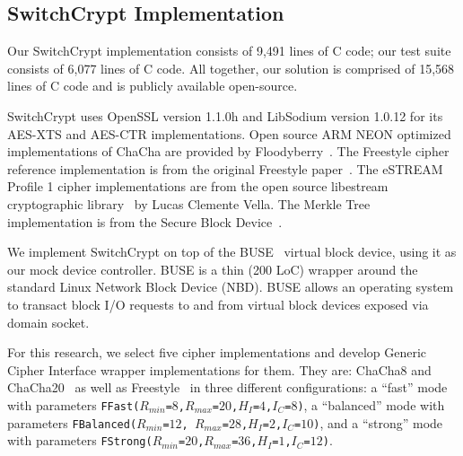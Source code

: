 
\subsection{SwitchCrypt Implementation} \label{subsec:implementation}

Our SwitchCrypt implementation consists of 9,491 lines of C code; our test suite
consists of 6,077 lines of C code. All together, our solution is comprised of
15,568 lines of C code and is publicly available open-source.

SwitchCrypt uses OpenSSL version 1.1.0h and LibSodium version 1.0.12 for its
AES-XTS and AES-CTR implementations. Open source ARM NEON optimized
implementations of ChaCha are provided by Floodyberry~\cite{Floodyberry}. The
Freestyle cipher reference implementation is from the original Freestyle
paper~\cite{Freestyle}. The eSTREAM Profile 1 cipher implementations are from
the open source libestream cryptographic library~\cite{libestream} by Lucas
Clemente Vella. The Merkle Tree implementation is from the Secure Block
Device~\cite{SBD}.

We implement SwitchCrypt on top of the BUSE~\cite{BUSE} virtual block device,
using it as our mock device controller. BUSE is a thin (200 LoC) wrapper around
the standard Linux Network Block Device (NBD). BUSE allows an operating system
to transact block I/O requests to and from virtual block devices exposed via
domain socket.

For this research, we select five cipher implementations and develop Generic
Cipher Interface wrapper implementations for them. They are: ChaCha8 and
ChaCha20~\cite{ChaCha20} as well as Freestyle~\cite{Freestyle} in three
different configurations: a ``fast'' mode with parameters
\texttt{FFast($R_{min}$=$8$,$R_{max}$=$20$,$H_I$=$4$,$I_C$=$8$)}, a ``balanced''
mode with parameters \texttt{FBalanced($R_{min}$=$12$,
$R_{max}$=$28$,$H_I$=$2$,$I_C$=$10$)}, and a ``strong'' mode with parameters
\texttt{FStrong($R_{min}$=$20$,$R_{max}$=$36$,$H_I$=$1$,$I_C$=$12$)}.
